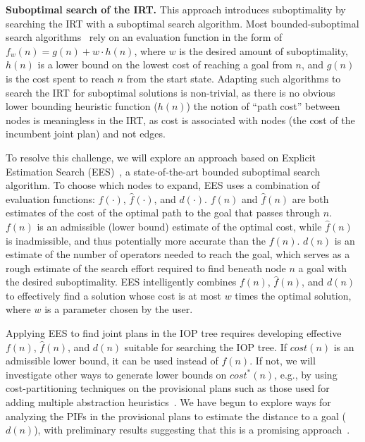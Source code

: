 \documentclass[11pt]{article}
\begin{document}
{\bf Suboptimal search of the IRT.} 
This approach introduces suboptimality by searching the IRT with a suboptimal search algorithm. Most bounded-suboptimal search algorithms~\cite{pohl1973avoidance,pearl1982studies,thayer2011bounded} rely on an evaluation function in the form of $f_w(n)=g(n)+w\cdot h(n)$, where $w$ is the desired amount of suboptimality, $h(n)$ is a lower bound on the lowest cost of reaching a goal from $n$, and $g(n)$ is the cost spent to reach $n$ from the start state. Adapting such algorithms to search the IRT for suboptimal solutions is non-trivial, as there is no obvious lower bounding heuristic function ($h(n)$) the notion of ``path cost'' between nodes is meaningless in the IRT, as cost is associated with nodes (the cost of the incumbent joint plan) and not edges. 

To resolve this challenge, we will explore an approach based on Explicit Estimation Search (EES)~\cite{thayer2011bounded}, a state-of-the-art bounded suboptimal search algorithm. To choose which nodes to expand, EES uses a combination of evaluation functions: $f(\cdot)$, $\hat{f}(\cdot)$, and $d(\cdot)$. $f(n)$ and $\hat{f}(n)$ are both estimates of the cost of the optimal path to the goal that passes through $n$. $f(n)$ is an admissible (lower bound) estimate of the optimal cost, while $\hat{f}(n)$ is inadmissible, and thus potentially more accurate than the $f(n)$. $d(n)$ is an estimate of the number of operators needed to reach the goal, which serves as a rough estimate of the search effort required to find  beneath node $n$ a goal with the desired suboptimality. EES intelligently combines $f(n)$, $\hat{f}(n)$, and $d(n)$ to effectively find a solution whose cost is at most $w$ times the optimal solution, where $w$ is a parameter chosen by the user.


Applying EES to find joint plans in the IOP tree requires developing effective $f(n)$, $\hat{f}(n)$, and $d(n)$ suitable for searching the IOP tree. If $cost(n)$ is an admissible lower bound, it can be used instead of $f(n)$. If not, we will investigate other ways to generate lower bounds on $cost^*(n)$, e.g., by using cost-partitioning techniques on the provisional plans such as those used for adding multiple abstraction heuristics~\cite{katz2010optimal}. We have begun to explore ways for analyzing the PIFs in the provisional plans to estimate the distance to a goal ($d(n)$), with preliminary results suggesting that this is a promising approach~\cite{barer2014suboptimal-socs}.
\end{document}
